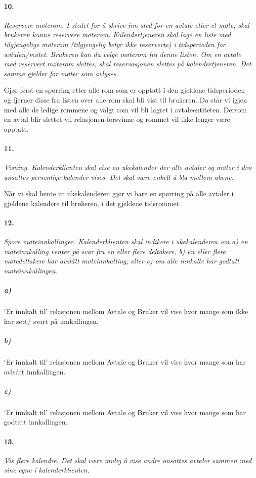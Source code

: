 \documentclass[titlepage]{article}
\begin{document}
\paragraph{10.}\textit{ Reservere møterom. I stedet for å skrive inn sted for en avtale eller et møte, skal brukeren kunne reservere møterom. Kalendertjeneren skal lage en liste med
tilgjengelige møterom (tilgjengelig betyr ikke reserverte) i tidsperioden for
avtalen/møtet. Brukeren kan da velge møterom fra denne listen. Om en avtale med
reservert møterom slettes, skal reservasjonen slettes på kalendertjeneren. Det samme
gjelder for møter som avlyses.}

Gjør først en spørring etter alle rom som er opptatt i den gjeldene tidsperioden og fjerner disse fra listen over alle rom skal bli vist til brukeren. Da står vi igjen med alle de ledige rommene og valgt rom vil bli lagret i avtaleentiteten. Dersom en avtal blir slettet vil relasjonen forsvinne og rommet vil ikke lenger være opptatt.

\paragraph{11.}\textit{ Visning. Kalenderklienten skal vise en ukekalender der alle avtaler og møter i den ansattes personlige kalender vises. Det skal være enkelt å bla mellom ukene.}

Når vi skal hente ut ukekalenderen gjør vi bare en spørring på alle avtaler i gjeldene kalendere til brukeren, i det gjeldene tidsrommet.

\paragraph{12.}\textit{ Spore møteinnkallinger. Kalenderklienten skal indikere i ukekalenderen om a) en
møteinnkalling venter på svar fra en eller flere deltakere, b) en eller flere
møtedeltakere har avslått møteinnkalling, eller c) om alle innkalte har godtatt
møteinnkallingen.}
\subparagraph{a)} ‘Er innkalt til’ relasjonen mellom Avtale og Bruker vil vise hvor mange som ikke har sett/ svart på innkallingen.

\subparagraph{b)} ‘Er innkalt til’ relasjonen mellom Avtale og Bruker vil vise hvor mange som har avlsått innkallingen.

\subparagraph{c)} ‘Er innkalt til’ relasjonen mellom Avtale og Bruker vil vise hvor mange som har godtatt innkallingen.

\paragraph{13.}\textit{ Vis flere kalendre. Det skal være mulig å vise andre ansattes avtaler sammen med sine
egne i kalenderklienten.}
\end{document}
